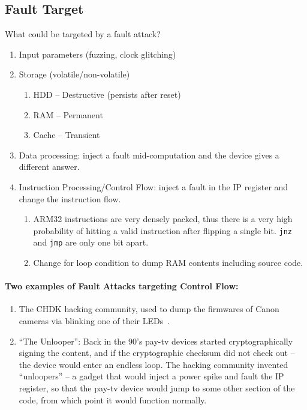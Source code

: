 \subsection{Fault Target}\label{subsec:fault_targets}
What could be targeted by a fault attack?
\begin{enumerate}
	\item Input parameters (fuzzing, clock glitching)
	\item Storage (volatile/non-volatile)
	\begin{enumerate}
		\item HDD -- Destructive (persists after reset)
		\item RAM -- Permanent
		\item Cache -- Transient
	\end{enumerate}
	\item Data processing: inject a fault mid-computation and the device gives a
	different answer.
	\item Instruction Processing/Control Flow: inject a fault in the IP register
	and change the instruction flow.
	\begin{enumerate}
		\item ARM32 instructions are very densely packed, thus there is a very
		high probability of hitting a valid instruction after flipping a single
		bit. \texttt{jnz} and \texttt{jmp} are only one bit apart.
		\item Change for loop condition to dump RAM contents including source
		code.
	\end{enumerate}
\end{enumerate}

\paragraph{Two examples of Fault Attacks targeting Control Flow:}
\begin{enumerate}
	\item The CHDK hacking community, used to dump the firmwares of Canon
	cameras via blinking one of their LEDs~\cite{chdk, canon}.

	\item ``The Unlooper'': Back in the 90's pay-tv devices started
	cryptographically signing the content, and if the cryptographic checksum did
	not check out -- the device would enter an endless loop. The hacking
	community invented ``unloopers'' -- a gadget that would inject a power spike
	and fault the IP register, so that the pay-tv device would jump to some
	other section of the code, from which point it would function normally.
\end{enumerate}

